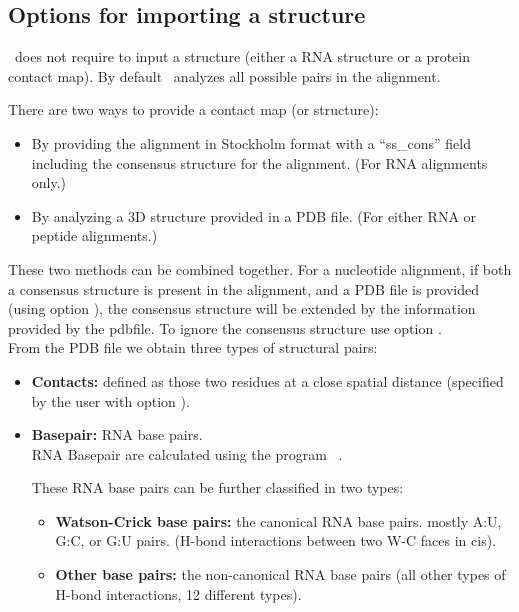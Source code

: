 \subsection{Options for importing a structure}

\rscape\ does not require to input a structure (either a RNA structure
or a protein contact map). By default \rscape\ analyzes all possible
pairs in the alignment.
\vspace{1mm}

\noindent
There are two ways to provide a contact map (or structure):

\begin{itemize}

\item By providing the alignment in Stockholm format with a ``ss\_cons'' field including the consensus
structure for the alignment. (For RNA alignments only.)

\item By analyzing a 3D structure provided in a PDB file. (For either RNA or peptide alignments.)\\
\end{itemize}

\noindent
These two methods can be combined together. For a nucleotide
alignment, if both a consensus structure is present in the alignment,
and a PDB file is provided (using option ), the
consensus structure will be extended by the information provided by
the pdbfile.  To ignore the consensus structure use
option .\\


\noindent
From the PDB file we obtain three types of structural pairs:

\begin{itemize}
\item \textbf{Contacts:} defined as those two residues at a close spatial distance (specified by the user with option ).
\item \textbf{Basepair:} RNA base pairs. \\
RNA Basepair are calculated using the program ~\citep{YangWesthof03}.

These RNA base pairs can be further classified in two types:
\begin{itemize}
\item \textbf{Watson-Crick base pairs:} the canonical RNA base pairs. mostly A:U, G:C, or G:U pairs. (H-bond interactions between two W-C faces in cis).
\item \textbf{Other base pairs:} the non-canonical RNA base pairs (all other types of H-bond interactions, 12 different types).
\end{itemize}
\end{itemize}

